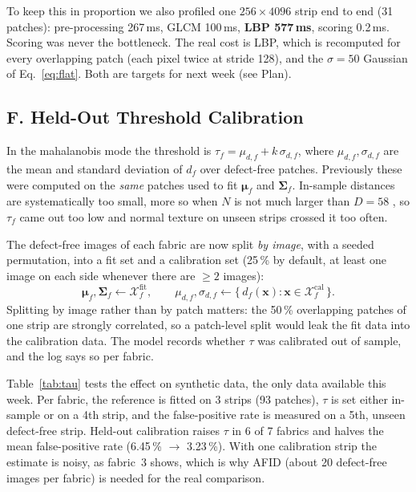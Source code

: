 \documentclass[11pt,a4paper]{article}
\begin{document}
To keep this in proportion we also profiled one $256\times4096$ strip end to end (31 patches): pre-processing 267\,ms, GLCM 100\,ms, \textbf{LBP 577\,ms}, scoring 0.2\,ms. Scoring was never the bottleneck. The real cost is LBP, which is recomputed for every overlapping patch (each pixel twice at stride 128), and the $\sigma=50$ Gaussian of Eq.~\eqref{eq:flat}. Both are targets for next week (see Plan).

\subsection*{F. Held-Out Threshold Calibration}

In the mahalanobis mode the threshold is $\tau_f=\mu_{d,f}+k\,\sigma_{d,f}$, where $\mu_{d,f},\sigma_{d,f}$ are the mean and standard deviation of $d_f$ over defect-free patches. Previously these were computed on the \emph{same} patches used to fit $\boldsymbol{\mu}_f$ and $\boldsymbol{\Sigma}_f$. In-sample distances are systematically too small, more so when $N$ is not much larger than $D=58$ \cite{hastie2009}, so $\tau_f$ came out too low and normal texture on unseen strips crossed it too often.

The defect-free images of each fabric are now split \emph{by image}, with a seeded permutation, into a fit set and a calibration set (25\,\% by default, at least one image on each side whenever there are $\geq 2$ images):
\begin{equation}
\boldsymbol{\mu}_f,\boldsymbol{\Sigma}_f \leftarrow \mathcal{X}^{\text{fit}}_f,\qquad
\mu_{d,f},\sigma_{d,f} \leftarrow \{\,d_f(\mathbf{x}) : \mathbf{x}\in\mathcal{X}^{\text{cal}}_f\,\}.
\label{eq:calib}
\end{equation}
Splitting by image rather than by patch matters: the 50\,\% overlapping patches of one strip are strongly correlated, so a patch-level split would leak the fit data into the calibration data. The model records whether $\tau$ was calibrated out of sample, and the log says so per fabric.

Table~\ref{tab:tau} tests the effect on synthetic data, the only data available this week. Per fabric, the reference is fitted on 3 strips (93 patches), $\tau$ is set either in-sample or on a 4th strip, and the false-positive rate is measured on a 5th, unseen defect-free strip. Held-out calibration raises $\tau$ in 6 of 7 fabrics and halves the mean false-positive rate (6.45\,\% $\rightarrow$ 3.23\,\%). With one calibration strip the estimate is noisy, as fabric~3 shows, which is why AFID (about 20 defect-free images per fabric) is needed for the real comparison.
\end{document}
